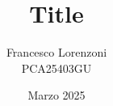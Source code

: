 


% 

\title{Title}
\author{Francesco Lorenzoni\\\textsc{PCA25403GU}}
\date{Marzo 2025}


\makeatletter
\renewcommand{\l@section}{\@dottedtocline{1}{1.5em}{2.6em}}
\renewcommand{\l@subsection}{\@dottedtocline{2}{2.5em}{3.6em}}
\renewcommand{\l@subsubsection}{\@dottedtocline{3}{3.5em}{4.5em}}
\makeatother
{} %



\doparttoc[n]



\tableofcontents



